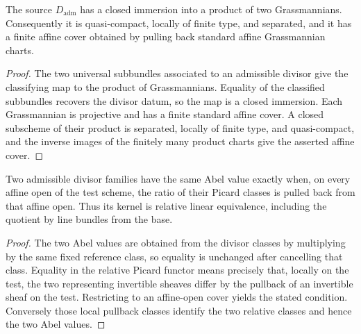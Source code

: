 \begin{theorem}
  \label{thm:admissibleDivisorSource_projectLocal}
  \leanok
  The source \(D_{\mathrm{adm}}\) has a closed immersion into a product of two
  Grassmannians.  Consequently it is quasi-compact, locally of finite type, and separated,
  and it has a finite affine cover obtained by pulling back standard affine Grassmannian
  charts.
\end{theorem}
\begin{proof}
  The two universal subbundles associated to an admissible divisor give the classifying map
  to the product of Grassmannians.  Equality of the classified subbundles recovers the
  divisor datum, so the map is a closed immersion.  Each Grassmannian is projective and has a
  finite standard affine cover.  A closed subscheme of their product is separated, locally
  of finite type, and quasi-compact, and the inverse images of the finitely many product
  charts give the asserted affine cover.
\end{proof}

\begin{theorem}
  \label{thm:admissibleAbel_kernel}
  \leanok
  Two admissible divisor families have the same Abel value exactly when, on every affine open
  of the test scheme, the ratio of their Picard classes is pulled back from that affine open.
  Thus its kernel is relative linear equivalence, including the quotient by line bundles from
  the base.
\end{theorem}
\begin{proof}
  The two Abel values are obtained from the divisor classes by multiplying by the same fixed
  reference class, so equality is unchanged after cancelling that class.  Equality in the
  relative Picard functor means precisely that, locally on the test, the two representing
  invertible sheaves differ by the pullback of an invertible sheaf on the test.  Restricting
  to an affine-open cover yields the stated condition.  Conversely those local pullback
  classes identify the two relative classes and hence the two Abel values.
\end{proof}

